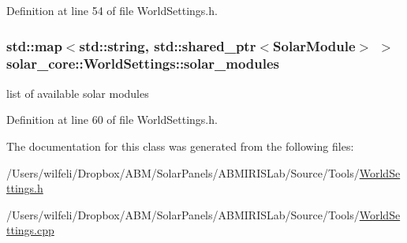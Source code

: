 Definition at line 54 of file World\+Settings.\+h.

\hypertarget{classsolar__core_1_1_world_settings_acb33be8576dd4f60836373ea1b573fe6}{}
\subsubsection[{solar\+\_\+modules}]{\setlength{\rightskip}{0pt plus 5cm}std\+::map$<$std\+::string, std\+::shared\+\_\+ptr$<${\bf Solar\+Module}$>$ $>$ solar\+\_\+core\+::\+World\+Settings\+::solar\+\_\+modules}\label{classsolar__core_1_1_world_settings_acb33be8576dd4f60836373ea1b573fe6}
list of available solar modules 

Definition at line 60 of file World\+Settings.\+h.



The documentation for this class was generated from the following files\+:\begin{DoxyCompactItemize}
\item 
/\+Users/wilfeli/\+Dropbox/\+A\+B\+M/\+Solar\+Panels/\+A\+B\+M\+I\+R\+I\+S\+Lab/\+Source/\+Tools/\hyperlink{_world_settings_8h}{World\+Settings.\+h}\item 
/\+Users/wilfeli/\+Dropbox/\+A\+B\+M/\+Solar\+Panels/\+A\+B\+M\+I\+R\+I\+S\+Lab/\+Source/\+Tools/\hyperlink{_world_settings_8cpp}{World\+Settings.\+cpp}\end{DoxyCompactItemize}
